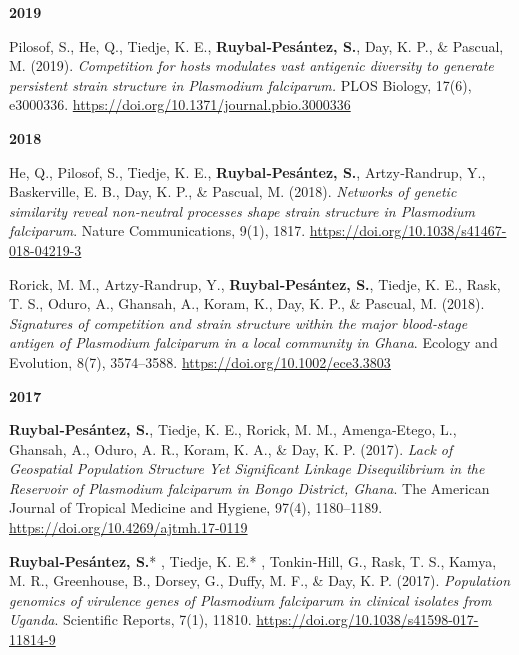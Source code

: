 \documentclass[11pt,a4paper,]{awesome-cv}
\begin{document}
\setlength{\leftskip}{0cm}

\textbf{2019}

\setlength{\leftskip}{1cm}

Pilosof, S., He, Q., Tiedje, K. E., \textbf{Ruybal‐Pesántez, S.}, Day,
K. P., \& Pascual, M. (2019). \emph{Competition for hosts modulates vast
antigenic diversity to generate persistent strain structure in
Plasmodium falciparum.} PLOS Biology, 17(6), e3000336.
\url{https://doi.org/10.1371/journal.pbio.3000336}

\setlength{\leftskip}{0cm}

\textbf{2018}

\setlength{\leftskip}{1cm}

He, Q., Pilosof, S., Tiedje, K. E., \textbf{Ruybal‐Pesántez, S.},
Artzy‐Randrup, Y., Baskerville, E. B., Day, K. P., \& Pascual, M.
(2018). \emph{Networks of genetic similarity reveal non‐neutral
processes shape strain structure in Plasmodium falciparum}. Nature
Communications, 9(1), 1817.
\url{https://doi.org/10.1038/s41467-018-04219-3}

Rorick, M. M., Artzy‐Randrup, Y., \textbf{Ruybal‐Pesántez, S.}, Tiedje,
K. E., Rask, T. S., Oduro, A., Ghansah, A., Koram, K., Day, K. P., \&
Pascual, M. (2018). \emph{Signatures of competition and strain structure
within the major blood‐stage antigen of Plasmodium falciparum in a local
community in Ghana}. Ecology and Evolution, 8(7), 3574--3588.
\url{https://doi.org/10.1002/ece3.3803}

\setlength{\leftskip}{0cm}

\textbf{2017}

\setlength{\leftskip}{1cm}

\textbf{Ruybal‐Pesántez, S.}, Tiedje, K. E., Rorick, M. M.,
Amenga‐Etego, L., Ghansah, A., Oduro, A. R., Koram, K. A., \& Day, K. P.
(2017). \emph{Lack of Geospatial Population Structure Yet Significant
Linkage Disequilibrium in the Reservoir of Plasmodium falciparum in
Bongo District, Ghana}. The American Journal of Tropical Medicine and
Hygiene, 97(4), 1180--1189. \url{https://doi.org/10.4269/ajtmh.17-0119}

\textbf{Ruybal‐Pesántez, S.}* , Tiedje, K. E.* , Tonkin‐Hill, G., Rask,
T. S., Kamya, M. R., Greenhouse, B., Dorsey, G., Duffy, M. F., \& Day,
K. P. (2017). \emph{Population genomics of virulence genes of Plasmodium
falciparum in clinical isolates from Uganda}. Scientific Reports, 7(1),
11810. \url{https://doi.org/10.1038/s41598-017-11814-9}

\setlength{\leftskip}{0cm}
\end{document}
